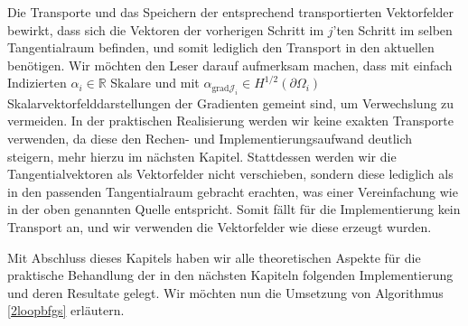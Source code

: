 Die Transporte und das Speichern der entsprechend transportierten Vektorfelder bewirkt, dass sich die Vektoren der vorherigen Schritt im $j$'ten Schritt im selben Tangentialraum befinden, und somit lediglich den Transport in den aktuellen benötigen.
Wir möchten den Leser darauf aufmerksam machen, dass mit einfach Indizierten $\alpha_i\in\mathbb{R}$ Skalare und mit $\alpha_{\text{grad}\mathcal{J}_i} \in H^{1/2}(\partial\Omega_i)$ Skalarvektorfelddarstellungen der Gradienten gemeint sind, um Verwechslung zu vermeiden.
In der praktischen Realisierung werden wir keine exakten Transporte verwenden, da diese den Rechen- und Implementierungsaufwand deutlich steigern, mehr hierzu im nächsten Kapitel. Stattdessen werden wir die Tangentialvektoren als Vektorfelder nicht verschieben, sondern diese lediglich als in den passenden Tangentialraum gebracht erachten, was einer Vereinfachung wie in der oben genannten Quelle entspricht. Somit fällt für die Implementierung kein Transport an, und wir verwenden die Vektorfelder wie diese erzeugt wurden. 

Mit Abschluss dieses Kapitels haben wir alle theoretischen Aspekte für die praktische Behandlung der in den nächsten Kapiteln folgenden Implementierung und deren Resultate gelegt. Wir möchten nun die Umsetzung von Algorithmus \ref{2loopbfgs} erläutern.

